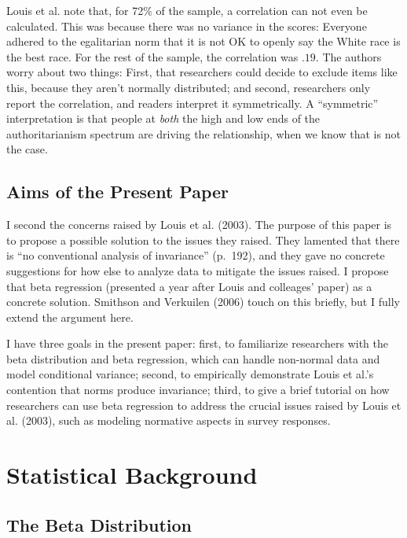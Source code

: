 \documentclass[english,man]{apa6}
\newcounter{author}
\theoremstyle{definition}
\theoremstyle{definition}
\theoremstyle{remark}
\begin{document}
Louis et al. note that, for 72\% of the sample, a correlation can not
even be calculated. This was because there was no variance in the
scores: Everyone adhered to the egalitarian norm that it is not OK to
openly say the White race is the best race. For the rest of the sample,
the correlation was \(.19\). The authors worry about two things: First,
that researchers could decide to exclude items like this, because they
aren't normally distributed; and second, researchers only report the
correlation, and readers interpret it symmetrically. A
\enquote{symmetric} interpretation is that people at \emph{both} the
high and low ends of the authoritarianism spectrum are driving the
relationship, when we know that is not the case.

\subsection{Aims of the Present Paper}\label{aims-of-the-present-paper}

I second the concerns raised by Louis et al. (2003). The purpose of this
paper is to propose a possible solution to the issues they raised. They
lamented that there is \enquote{no conventional analysis of invariance}
(p.~192), and they gave no concrete suggestions for how else to analyze
data to mitigate the issues raised. I propose that beta regression
(presented a year after Louis and colleages' paper) as a concrete
solution. Smithson and Verkuilen (2006) touch on this briefly, but I
fully extend the argument here.

I have three goals in the present paper: first, to familiarize
researchers with the beta distribution and beta regression, which can
handle non-normal data and model conditional variance; second, to
empirically demonstrate Louis et al.'s contention that norms produce
invariance; third, to give a brief tutorial on how researchers can use
beta regression to address the crucial issues raised by Louis et al.
(2003), such as modeling normative aspects in survey responses.

\section{Statistical Background}\label{statistical-background}

\subsection{The Beta Distribution}\label{the-beta-distribution}
\end{document}

